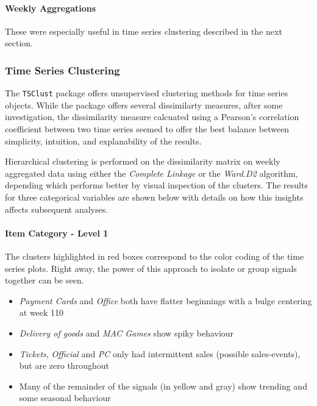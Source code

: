 \documentclass[floatsintext,man]{apa6}
\providecommand{\tightlist}{%
  \setlength{\itemsep}{0pt}\setlength{\parskip}{0pt}}
\theoremstyle{definition}
\theoremstyle{definition}
\theoremstyle{definition}
\theoremstyle{remark}
\begin{document}
\paragraph{Weekly Aggregations}\label{weekly-aggregations}

These were especially useful in time series clustering described in the
next section.

\subsubsection{Time Series Clustering}\label{time-series-clustering}

The \texttt{TSClust} package offers unsupervised clustering methods for
time series objects. While the package offers several dissimilarty
measures, after some investigation, the dissimilarity measure calcuated
using a Pearson's correlation coefficient between two time series seemed
to offer the best balance between simplicity, intuition, and
explanability of the results.

Hierarchical clustering is performed on the dissimilarity matrix on
weekly aggregated data using either the \emph{Complete Linkage} or the
\emph{Ward.D2} algorithm, depending which performs better by visual
inspection of the clusters. The results for three categorical variables
are shown below with details on how this insights affects subsequent
analyses.

\paragraph{Item Category - Level 1}\label{item-category---level-1}

The clusters highlighted in red boxes correspond to the color coding of
the time series plots. Right away, the power of this approach to isolate
or group signals together can be seen.

\begin{itemize}
\tightlist
\item
  \emph{Payment Cards} and \emph{Office} both have flatter beginnings
  with a bulge centering at week 110
\item
  \emph{Delivery of goods} and \emph{MAC Games} show spiky behaviour
\item
  \emph{Tickets}, \emph{Official} and \emph{PC} only had intermittent
  sales (possible sales-events), but are zero throughout
\item
  Many of the remainder of the signals (in yellow and gray) show
  trending and some seasonal behaviour
\end{itemize}
\end{document}
